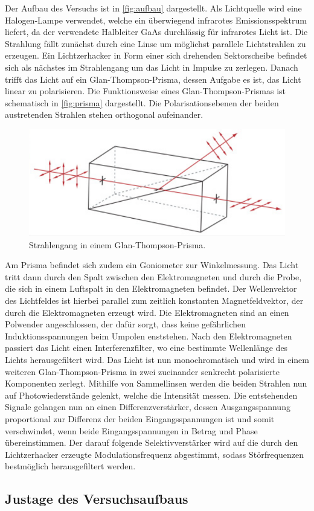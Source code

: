 Der Aufbau des Versuchs ist in \autoref{fig:aufbau} dargestellt.
Als Lichtquelle wird eine Halogen-Lampe verwendet, welche ein überwiegend infrarotes Emissionsspektrum liefert, da der verwendete Halbleiter
GaAs durchlässig für infrarotes Licht ist.
Die Strahlung fällt zunächst durch eine Linse um möglichst parallele Lichtstrahlen zu erzeugen.
Ein Lichtzerhacker in Form einer sich drehenden Sektorscheibe befindet sich als nächstes im Strahlengang um das Licht in Impulse zu zerlegen.
Danach trifft das Licht auf ein Glan-Thompson-Prisma, dessen Aufgabe es ist, das Licht linear zu polarisieren.
Die Funktionsweise eines Glan-Thompson-Prismas ist schematisch in \autoref{fig:prisma} dargestellt. Die Polarisationsebenen der beiden
austretenden Strahlen stehen orthogonal aufeinander.
\begin{figure}[H]
    \centering
    \includegraphics[scale=0.35]{Abbildungen/prisma.png}
    \caption{Strahlengang in einem Glan-Thompson-Prisma.\cite{Prisma}}
    \label{fig:prisma}
\end{figure}
Am Prisma befindet sich zudem ein Goniometer zur Winkelmessung.
Das Licht tritt dann durch den Spalt zwischen den Elektromagneten und durch die Probe, die sich in einem Luftspalt in den Elektromagneten
befindet.
Der Wellenvektor des Lichtfeldes ist hierbei parallel zum zeitlich konstanten Magnetfeldvektor, der durch die Elektromagneten erzeugt wird.
Die Elektromagneten sind an einen Polwender angeschlossen, der dafür sorgt, dass keine gefährlichen Induktionsspannungen beim Umpolen enststehen.
Nach den Elektromagneten passiert das Licht einen Interferenzfilter, wo eine bestimmte Wellenlänge des Lichts herausgefiltert wird.
Das Licht ist nun monochromatisch und wird in einem weiteren Glan-Thompson-Prisma in
zwei zueinander senkrecht polarisierte Komponenten zerlegt.
Mithilfe von Sammellinsen werden die beiden Strahlen nun auf Photowiederstände gelenkt, welche die Intensität messen.
Die entstehenden Signale gelangen nun an einen Differenzverstärker, dessen Ausgangsspannung proportional zur Differenz der beiden Eingangsspannungen
ist und somit verschwindet, wenn beide Eingangsspannungen in Betrag und Phase übereinstimmen.
Der darauf folgende Selektivverstärker wird auf die durch den Lichtzerhacker erzeugte
Modulationsfrequenz abgestimmt, sodass Störfrequenzen bestmöglich herausgefiltert werden.

\subsection{Justage des Versuchsaufbaus}
\label{sub:Justage}


